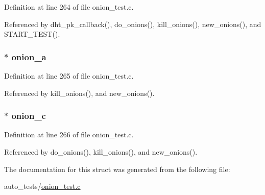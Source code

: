 Definition at line 264 of file onion\+\_\+test.\+c.



Referenced by dht\+\_\+pk\+\_\+callback(), do\+\_\+onions(), kill\+\_\+onions(), new\+\_\+onions(), and S\+T\+A\+R\+T\+\_\+\+T\+E\+S\+T().

\hypertarget{struct_onions_a3a345721fb6be385f4b4519679a4609f}{
\subsubsection[{onion\+\_\+a}]{$\ast$ onion\+\_\+a}}\label{struct_onions_a3a345721fb6be385f4b4519679a4609f}


Definition at line 265 of file onion\+\_\+test.\+c.



Referenced by kill\+\_\+onions(), and new\+\_\+onions().

\hypertarget{struct_onions_ae202b81f9a2c2fa80fd310a0996795fc}{
\subsubsection[{onion\+\_\+c}]{$\ast$ onion\+\_\+c}}\label{struct_onions_ae202b81f9a2c2fa80fd310a0996795fc}


Definition at line 266 of file onion\+\_\+test.\+c.



Referenced by do\+\_\+onions(), kill\+\_\+onions(), and new\+\_\+onions().



The documentation for this struct was generated from the following file\+:\begin{DoxyCompactItemize}
\item 
auto\+\_\+tests/\hyperlink{onion__test_8c}{onion\+\_\+test.\+c}\end{DoxyCompactItemize}
